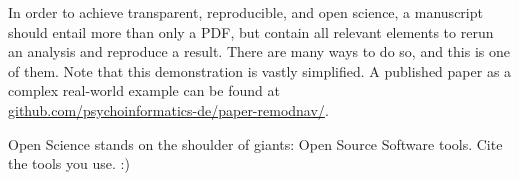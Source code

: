 In order to achieve transparent, reproducible, and open science, a manuscript
should entail more than only a PDF, but contain all relevant elements to rerun
an analysis and reproduce a result.
There are many ways to do so, and this is one of them.
%
Note that this demonstration is vastly simplified.
A published paper as a complex real-world example can be found at \\
\href{https://github.com/psychoinformatics-de/paper-remodnav/}{github.com/psychoinformatics-de/paper-remodnav/}.


\begin{acknowledgements}

Open Science stands on the shoulder of giants: Open Source Software tools.
Cite the tools you use. :)

\end{acknowledgements}





\clearpage



